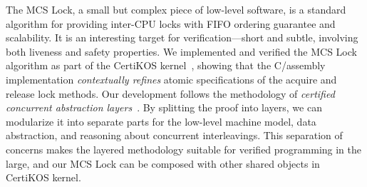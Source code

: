 The MCS Lock, a small but complex piece of low-level software, is a standard algorithm for providing inter-CPU locks with FIFO ordering guarantee and scalability.
It is an interesting target for verification---short and subtle, involving both liveness and safety properties. 
We implemented and verified the MCS Lock algorithm as part of the CertiKOS kernel~\cite{certikos16}, showing that the C/assembly implementation
 {\em contextually refines} atomic specifications of the acquire and release lock methods.
Our development follows the methodology of \emph{certified concurrent abstraction layers}~\cite{dscal15,ccal16}. 
By splitting the proof into layers, we can modularize it into separate parts for the low-level machine model, data abstraction, and reasoning about concurrent interleavings.  This separation of concerns makes the layered methodology suitable for verified programming in the large, and our MCS Lock can be composed with other shared objects in CertiKOS kernel.
